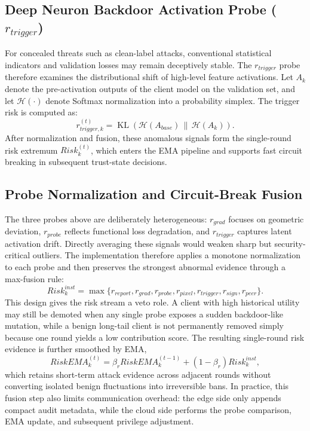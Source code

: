 \documentclass[final,5p,times,twocolumn]{elsarticle/elsarticle}
\begin{document}
\subsection{Deep Neuron Backdoor Activation Probe \texorpdfstring{($r_{trigger}$)}{(r-trigger)}}
For concealed threats such as clean-label attacks, conventional statistical indicators and validation losses may remain deceptively stable. The $r_{trigger}$ probe therefore examines the distributional shift of high-level feature activations. Let $A_k$ denote the pre-activation outputs of the client model on the validation set, and let $\mathcal{H}(\cdot)$ denote Softmax normalization into a probability simplex. The trigger risk is computed as:
\begin{equation}
    r_{trigger,k}^{(t)} = \operatorname{KL}\left(\mathcal{H}(A_{base})\,\|\,\mathcal{H}(A_k)\right).
\end{equation}
After normalization and fusion, these anomalous signals form the single-round risk extremum $Risk_k^{(t)}$, which enters the EMA pipeline and supports fast circuit breaking in subsequent trust-state decisions.

\subsection{Probe Normalization and Circuit-Break Fusion}
The three probes above are deliberately heterogeneous: $r_{grad}$ focuses on geometric deviation, $r_{probe}$ reflects functional loss degradation, and $r_{trigger}$ captures latent activation drift. Directly averaging these signals would weaken sharp but security-critical outliers. The implementation therefore applies a monotone normalization to each probe and then preserves the strongest abnormal evidence through a max-fusion rule:
\begin{equation}
    Risk_{k}^{inst}=\max\{r_{report},r_{grad},r_{probe},r_{pixel},r_{trigger},r_{sign},r_{peer}\}.
\end{equation}
This design gives the risk stream a veto role. A client with high historical utility may still be demoted when any single probe exposes a sudden backdoor-like mutation, while a benign long-tail client is not permanently removed simply because one round yields a low contribution score. The resulting single-round risk evidence is further smoothed by EMA,
\begin{equation}
    RiskEMA_{k}^{(t)}=\beta_r RiskEMA_{k}^{(t-1)}+(1-\beta_r)Risk_{k}^{inst},
\end{equation}
which retains short-term attack evidence across adjacent rounds without converting isolated benign fluctuations into irreversible bans. In practice, this fusion step also limits communication overhead: the edge side only appends compact audit metadata, while the cloud side performs the probe comparison, EMA update, and subsequent privilege adjustment.
\end{document}
